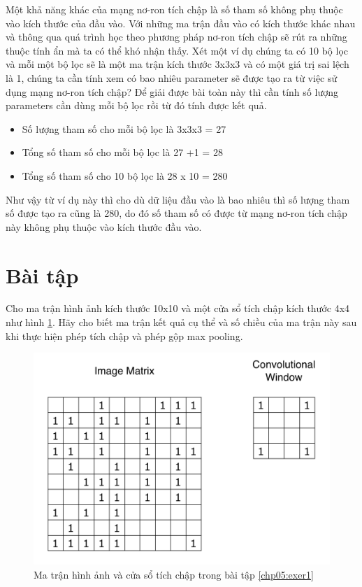 Một khả năng khác của mạng nơ-ron tích chập là số tham số không phụ thuộc vào kích thước của đầu vào. Với những ma trận đầu vào có kích thước khác nhau và thông qua quá trình học theo phương pháp nơ-ron tích chập sẽ rút ra những thuộc tính ẩn mà ta có thể khó nhận thấy. Xét một ví dụ chúng ta có 10 bộ lọc và mỗi một bộ lọc sẽ là một ma trận kích thước 3x3x3 và có một giá trị sai lệch là 1, chúng ta cần tính xem có bao nhiêu parameter sẽ được tạo ra từ việc sử dụng mạng nơ-ron tích chập? Để giải được bài toàn này thì cần tính số lượng parameters cần dùng mỗi bộ lọc rồi từ đó tính được kết quả.

\begin{itemize}
    \item Số lượng tham số cho mỗi bộ lọc là 3x3x3 = 27
    \item Tổng số tham số cho mỗi bộ lọc là 27 +1 = 28
    \item Tổng số tham số cho 10 bộ lọc là 28 x 10 = 280
\end{itemize}

Như vậy từ ví dụ này thì cho dù dữ liệu đầu vào là bao nhiêu thì số lượng tham số được tạo ra cũng là 280, do đó số tham số có được từ mạng nơ-ron tích chập này không phụ thuộc vào kích thước đầu vào.

\section{Bài tập}
\begin{exer}
\label{chp05:exer1}
Cho ma trận hình ảnh kích thước 10x10 và một cửa sổ tích chập kích thước 4x4 như hình \ref{fig:CNNExercise1}. Hãy cho biết ma trận kết quả cụ thể và số chiều của ma trận này sau khi thực hiện phép tích chập và phép gộp max pooling.

\begin{figure}[!h]
	\centering
		\includegraphics[width=0.8\columnwidth]{chapter05/figure/cnn_exercise_1.png}
		\centering
	\caption{Ma trận hình ảnh và cửa sổ tích chập trong bài tập \ref{chp05:exer1}}
	\label{fig:CNNExercise1}
\end{figure}
\end{exer}

